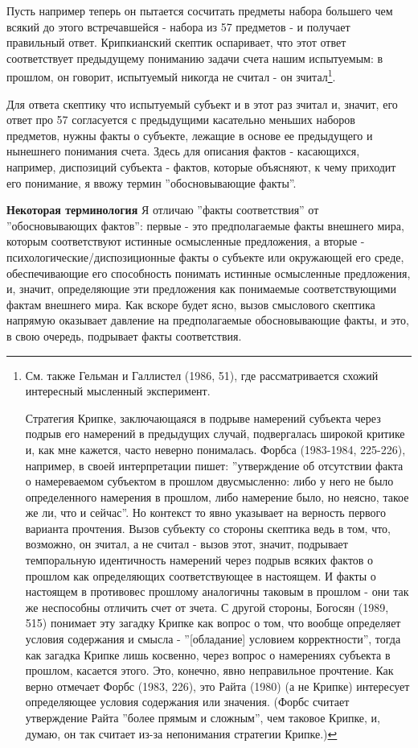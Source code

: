 \documentclass[12pt]{book}
\begin{document}
Пусть например теперь он пытается сосчитать предметы набора большего чем всякий до этого встречавшейся - набора из 57 предметов - и получает правильный ответ. Крипкианский скептик оспаривает, что этот ответ соответствует предыдущему пониманию задачи счета нашим испытуемым: в прошлом, он говорит, испытуемый никогда не считал - он зчитал\footnote{См. также Гельман и Галлистел (1986, 51), где рассматривается схожий интересный мысленный эксперимент.

Стратегия Крипке, заключающаяся в подрыве намерений субъекта через подрыв его намерений в предыдущих случай, подвергалась широкой критике и, как мне кажется, часто неверно понималась. Форбса (1983-1984, 225-226), например, в своей интерпретации пишет: ''утверждение об отсутствии факта о намереваемом субъектом в прошлом двусмысленно: либо у него не было определенного намерения в прошлом, либо намерение было, но неясно, такое же ли, что и сейчас''. Но контекст то явно указывает на верность первого варианта прочтения. Вызов субъекту со стороны скептика ведь в том, что, возможно, он зчитал, а не считал - вызов этот, значит, подрывает темпоральную идентичность намерений через подрыв всяких фактов о прошлом как определяющих соответствующее в настоящем. И факты о настоящем в противовес прошлому аналогичны таковым в прошлом - они так же неспособны отличить счет от зчета. С другой стороны, Богосян (1989, 515) понимает эту загадку Крипке как вопрос о том, что вообще определяет условия содержания и смысла - ''[обладание] условием корректности'', тогда как загадка Крипке лишь косвенно, через вопрос о намерениях субъекта в прошлом, касается этого. Это, конечно, явно неправильное прочтение. Как верно отмечает Форбс (1983, 226), это Райта (1980) (а не Крипке) интересует определяющее условия содержания или значения. (Форбс считает утверждение Райта ''более прямым и сложным'', чем таковое Крипке, и, думаю, он так считает из-за непонимания стратегии Крипке.)}.

Для ответа скептику что испытуемый субъект и в этот раз зчитал и, значит, его ответ про 57 согласуется с предыдущими касательно меньших наборов предметов, нужны факты о субъекте, лежащие в основе ее предыдущего и нынешнего понимания счета. Здесь для описания фактов - касающихся, например, диспозиций субъекта - фактов, которые объясняют, к чему приходит его понимание, я ввожу термин ''обосновывающие факты''.

\textbf{Некоторая терминология} Я отличаю ''факты соответствия'' от ''обосновывающих фактов'': первые - это предполагаемые факты внешнего мира, которым соответствуют истинные осмысленные предложения, а вторые - психологические/диспозиционные факты о субъекте или окружающей его среде, обеспечивающие его способность понимать истинные осмысленные предложения, и, значит, определяющие эти предложения как понимаемые соответствующими фактам внешнего мира. Как вскоре будет ясно, вызов смыслового скептика напрямую оказывает давление на предполагаемые обосновывающие факты, и это, в свою очередь, подрывает факты соответствия.
\end{document}
